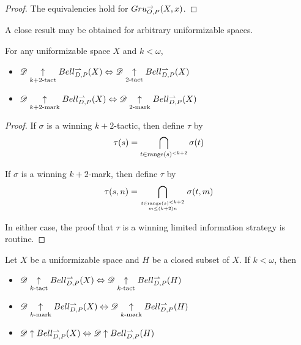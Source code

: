\begin{proof}
  The equivalencies hold for $Gru_{O,P}^{\to}(X,x)$.
\end{proof}

A close result may be obtained for arbitrary uniformizable spaces.

\begin{prop} For any uniformizable space $X$ and $k<\omega$,
  \begin{itemize}
    \item
      $
        \mathscr{D}\underset{k+2\text{-tact}}{\uparrow}Bell_{D,P}^{\rightharpoonup}(X)
          \Leftrightarrow
        \mathscr{D}\underset{2\text{-tact}}{\uparrow}Bell_{D,P}^{\rightharpoonup}(X)
      $
    \item
      $
        \mathscr{D}\underset{k+2\text{-mark}}{\uparrow}Bell_{D,P}^{\rightharpoonup}(X)
          \Leftrightarrow
        \mathscr{D}\underset{2\text{-mark}}{\uparrow}Bell_{D,P}^{\rightharpoonup}(X)
      $
  \end{itemize}
\end{prop}

\begin{proof}
  If $\sigma$ is a winning $k+2$-tactic, then define $\tau$ by
    \[
      \tau (s)
        =
      \bigcap_{t\in \text{range}(s)^{<k+2}}
      \sigma(t)
    \]

  If $\sigma$ is a winning $k+2$-mark, then define $\tau$ by
    \[
      \tau (s,n)
        =
      \bigcap_{t\in \text{range}(s)^{<k+2} \atop {m\leq(k+2)n}}
      \sigma(t,m)
    \]

  In either case, the proof that $\tau$ is a winning limited information
  strategy is routine.
\end{proof}


\begin{thm}
  Let $X$ be a uniformizable space and $H$ be a closed subset of $X$.
  If $k<\omega$, then
  \begin{itemize}
    \item
      $
        \mathscr{D} \underset{k\text{-tact}}{\uparrow} Bell_{D,P}^{\rightharpoonup}(X)
          \Leftrightarrow
        \mathscr{D} \underset{k\text{-tact}}{\uparrow} Bell_{D,P}^{\rightharpoonup}(H)
      $
    \item
      $
        \mathscr{D} \underset{k\text{-mark}}{\uparrow} Bell_{D,P}^{\rightharpoonup}(X)
          \Leftrightarrow
        \mathscr{D} \underset{k\text{-mark}}{\uparrow} Bell_{D,P}^{\rightharpoonup}(H)
      $
    \item
      $
        \mathscr{D} \uparrow Bell_{D,P}^{\rightharpoonup}(X)
          \Leftrightarrow
        \mathscr{D} \uparrow Bell_{D,P}^{\rightharpoonup}(H)
      $
  \end{itemize}
\end{thm}

